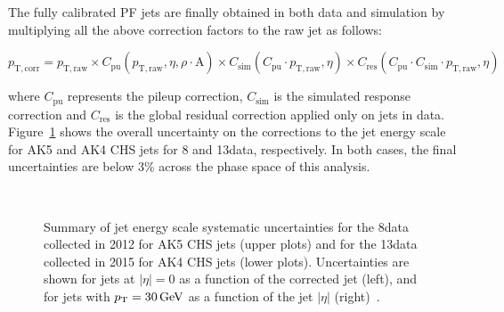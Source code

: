 The fully calibrated PF jets are finally obtained in both data and simulation by multiplying all the above correction factors to the raw jet \pt as follows:

\begin{equation}
p_\mathrm{T,corr} = p_\mathrm{T,raw} \times C_\mathrm{pu}(p_\mathrm{T,raw},\eta,\rho\cdot\mathrm{A}) \times C_\mathrm{sim}(C_\mathrm{pu} \cdot p_\mathrm{T,raw},\eta) \times C_\mathrm{res}(C_\mathrm{pu} \cdot C_\mathrm{sim} \cdot p_\mathrm{T,raw},\eta)
\end{equation}

where $C_\mathrm{pu}$ represents the pileup correction, $C_\mathrm{sim}$ is the simulated response correction and $C_\mathrm{res}$ is the global residual correction applied only on jets in data.
Figure~\ref{fig:jesunc813TeV} shows the overall uncertainty on the corrections to the jet energy scale for AK5 and AK4 CHS jets for 8 and 13\TeV data, respectively. In both cases, the final uncertainties are below 3\% across the phase space of this analysis.

\begin{figure}[!htb]
\centering
{}
\\
\caption{Summary of jet energy scale systematic uncertainties for the 8\TeV data collected in 2012 for AK5 CHS jets (upper plots) and for the 13\TeV data collected in 2015 for AK4 CHS jets (lower plots). Uncertainties are shown for jets at $|\eta| = 0$ as a function of the corrected jet \pt (left), and for jets with $p_{\mathrm{T}} = 30\,\text{Ge\hspace{-.08em}V}$ as a function of the jet $|\eta|$ (right)~\cite{Khachatryan:2016kdb,CMS-DP-2016-020}.}
\label{fig:jesunc813TeV}
\end{figure}

